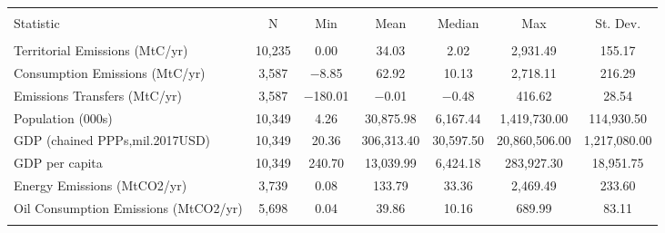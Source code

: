 
\begin{tabular}{@{\extracolsep{5pt}}lcccccc} 
\\[-1.8ex]\hline 
\hline \\[-1.8ex] 
Statistic & \multicolumn{1}{c}{N} & \multicolumn{1}{c}{Min} & \multicolumn{1}{c}{Mean} & \multicolumn{1}{c}{Median} & \multicolumn{1}{c}{Max} & \multicolumn{1}{c}{St. Dev.} \\ 
\hline \\[-1.8ex] 
Territorial Emissions (MtC/yr) & 10,235 & 0.00 & 34.03 & 2.02 & 2,931.49 & 155.17 \\ 
Consumption Emissions (MtC/yr) & 3,587 & $-$8.85 & 62.92 & 10.13 & 2,718.11 & 216.29 \\ 
Emissions Transfers (MtC/yr) & 3,587 & $-$180.01 & $-$0.01 & $-$0.48 & 416.62 & 28.54 \\ 
Population (000s) & 10,349 & 4.26 & 30,875.98 & 6,167.44 & 1,419,730.00 & 114,930.50 \\ 
GDP (chained PPPs,mil.2017USD) & 10,349 & 20.36 & 306,313.40 & 30,597.50 & 20,860,506.00 & 1,217,080.00 \\ 
GDP per capita & 10,349 & 240.70 & 13,039.99 & 6,424.18 & 283,927.30 & 18,951.75 \\ 
Energy Emissions (MtCO2/yr) & 3,739 & 0.08 & 133.79 & 33.36 & 2,469.49 & 233.60 \\ 
Oil Consumption Emissions (MtCO2/yr) & 5,698 & 0.04 & 39.86 & 10.16 & 689.99 & 83.11 \\ 
\hline \\[-1.8ex] 
\end{tabular} 
